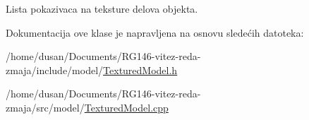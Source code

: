 Lista pokazivaca na teksture delova objekta. 



Dokumentacija ove klase je napravljena na osnovu sledećih datoteka\+:\begin{DoxyCompactItemize}
\item 
/home/dusan/\+Documents/\+R\+G146-\/vitez-\/reda-\/zmaja/include/model/\hyperlink{TexturedModel_8h}{Textured\+Model.\+h}\item 
/home/dusan/\+Documents/\+R\+G146-\/vitez-\/reda-\/zmaja/src/model/\hyperlink{TexturedModel_8cpp}{Textured\+Model.\+cpp}\end{DoxyCompactItemize}
